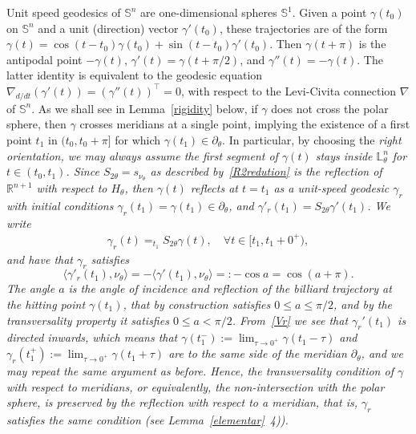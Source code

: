 \documentclass[11pt,a4paper,times]{amsart}
\theoremstyle{plain}
\theoremstyle{definition}
\numberwithin{equation}{section}
\newcommand{\R}{\mathbb{R}}
\newcommand{\Se}{\mathbb{S}}
\newcommand{\lune}[2]{\mathbb{L}^{#1}_{#2}}
\newcommand{\txtg}{\textcolor{green}}
\begin{document}
Unit speed geodesics of $\Se^n$ are one-dimensional spheres $\Se^1$. Given a point $\gamma(t_{0})$ on $\mathbb{S}^{n}$ and
 a unit (direction) vector $\gamma'(t_{0})$, these trajectories are of the form $\gamma(t)=\cos(t-t_0) \gamma(t_0)+\sin(t-t_0) \gamma'(t_0)$.
 Then $\gamma(t+\pi)$ is the antipodal point $-\gamma(t)$,
 $\gamma'(t)=\gamma(t+\pi/2)$, and  $\gamma''(t)=-\gamma(t)$. The latter identity is equivalent to the geodesic equation
 $\nabla_{d/dt}(\gamma'{(t)})=(\gamma''(t))^{\top}=0$, with respect to the Levi-Civita connection $\nabla$ of $\Se^n$.
 {As we shall see in} Lemma~\ref{rigidity} below, if $\gamma$ does not cross the polar sphere, then $\gamma$ crosses meridians at a
 single point, {implying the existence of a first point $t_{1}$ in $(t_0, t_0+\pi]$ for which $\gamma(t_1)\in \partial_{\theta}$.}
 In particular,  by choosing the \em right orientation, \em  we may always assume the first segment of $\gamma(t)$ stays inside
 $\lune{n}{\theta}$ for $t\in (t_0,t_1)$.
  Since $S_{2\theta}=s_{\nu_{\theta}}$ as described by~\eqref{R2redution} is the reflection of $\R^{n+1}$ with respect to $H_{\theta}$,
  then $\gamma(t)$ reflects at $t=t_1$  as a unit-speed geodesic {$\gamma_{r}$} with initial conditions
$ \gamma_r(t_1)=\gamma(t_1)\in \partial_{\theta}$, and  $\gamma'_r(t_1)=
S_{2\theta}\gamma'(t_1)$.
  We write
 \begin{gather}\label{gammar1}
 \gamma_r(t)=_{t_1} S_{2\theta}\gamma(t), \quad \forall t\in {[t_1, t_1+0^+)}, 
 \end{gather}
 and have that $\gamma_{r}$ satisfies
\begin{equation}\label{Vr}
\langle \gamma'_r(t_1),\nu_{\theta}\rangle= -\langle \gamma'(t_1), \nu_{\theta}\rangle=:-\cos a=\cos(a+\pi).
\end{equation}
The angle $a$ is the  angle of incidence and reflection of the billiard trajectory at the hitting point $\gamma(t_1)$, that by construction
satisfies   $0\leq a\leq \pi/2$, and by the  transversality property it satisfies $0\leq a<\pi/2$. From~\eqref{Vr} we see that $\gamma_r'(t_1)$
is directed inwards, which means that  $\gamma(t_1^-):=\lim_{\tau\to 0^+}\gamma(t_1-\tau)$ and $\gamma_r(t_1^+):=\lim_{\tau\to 0^+}\gamma(t_1+\tau)$ are to the same side of the meridian $ \partial_{\theta}$,
{and we may repeat the same argument as before.}
 Hence,  the  transversality condition of $\gamma$  with respect to meridians, or equivalently, the  non-intersection with the polar sphere, is
 preserved by the reflection with respect to a meridian, that is, $\gamma_r$ satisfies the same condition {(see Lemma~\ref{elementar}~4))}.
\end{document}
